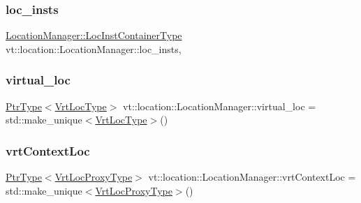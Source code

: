\subsubsection{\texorpdfstring{loc\+\_\+insts}{loc\_insts}}
{\footnotesize\ttfamily \hyperlink{structvt_1_1location_1_1_location_manager_adf4df6480ad89271a802d6d59bcf424e}{Location\+Manager\+::\+Loc\+Inst\+Container\+Type} vt\+::location\+::\+Location\+Manager\+::loc\+\_\+insts\hspace{0.3cm}{\ttfamily [static]}, {\ttfamily [private]}}

\mbox{\label{structvt_1_1location_1_1_location_manager_af8cbcba6c30a17a56d69fcf48007cdad}} 
\subsubsection{\texorpdfstring{virtual\+\_\+loc}{virtual\_loc}}
{\footnotesize\ttfamily \hyperlink{structvt_1_1location_1_1_location_manager_a32d8bca6ed6909a2190286408335d3b4}{Ptr\+Type}$<$\hyperlink{structvt_1_1location_1_1_location_manager_a06ec1698d93780afdf7873eeaa3a77b6}{Vrt\+Loc\+Type}$>$ vt\+::location\+::\+Location\+Manager\+::virtual\+\_\+loc = std\+::make\+\_\+unique$<$\hyperlink{structvt_1_1location_1_1_location_manager_a06ec1698d93780afdf7873eeaa3a77b6}{Vrt\+Loc\+Type}$>$()}

\mbox{\label{structvt_1_1location_1_1_location_manager_aec12685db3f4c7c9fec6348496689174}} 
\subsubsection{\texorpdfstring{vrt\+Context\+Loc}{vrtContextLoc}}
{\footnotesize\ttfamily \hyperlink{structvt_1_1location_1_1_location_manager_a32d8bca6ed6909a2190286408335d3b4}{Ptr\+Type}$<$\hyperlink{structvt_1_1location_1_1_location_manager_a3e410c85f5790a526a4eda22a9cc7881}{Vrt\+Loc\+Proxy\+Type}$>$ vt\+::location\+::\+Location\+Manager\+::vrt\+Context\+Loc = std\+::make\+\_\+unique$<$\hyperlink{structvt_1_1location_1_1_location_manager_a3e410c85f5790a526a4eda22a9cc7881}{Vrt\+Loc\+Proxy\+Type}$>$()}



